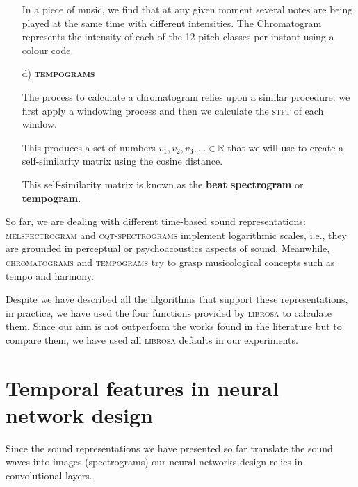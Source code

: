\begin{enumerate}
{    

    In a piece of music, we find that at any given moment several notes are being played at the same time with different intensities. The Chromatogram represents the intensity of each of the 12 pitch classes per instant using a colour code.
    \newpage
  }

  \item [d)] {{\bf \textsc{tempograms}} \citep{tempo}}

  \item [ ]{
    The process to calculate a chromatogram relies upon a similar procedure: we first apply a windowing process and then we calculate the \textsc{stft} of each window.


    This produces a set of numbers $v_1, v_2, v_3, \ldots \in \mathbb{R}$ that we will use to create a self-similarity matrix using the cosine distance.


    This self-similarity matrix is known as the {\bf beat spectrogram} or {\bf tempogram}.
  }
\end{enumerate}

So far, we are dealing with different time-based sound representations: \textsc{melspectrogram} and \textsc{cqt-spectrograms} implement logarithmic scales, i.e., they are grounded in perceptual or psychoacoustics aspects of sound. Meanwhile, \textsc{chromatograms} and \textsc{tempograms} try to grasp musicological concepts such as tempo and harmony.

Despite we have described all the algorithms that support these representations, in practice, we have used the four functions provided by \textsc{librosa} to calculate them. Since our aim is not outperform the works found in the literature but to compare them, we have used all \textsc{librosa} defaults in our experiments.

\section{Temporal features in neural network design}\label{sec:temporalfeat}

Since the sound representations we have presented so far translate the sound waves into images (spectrograms) our neural networks design relies in convolutional layers.


